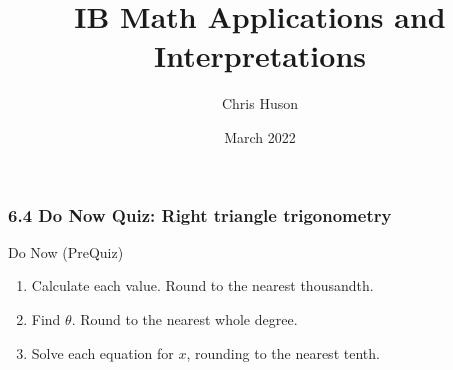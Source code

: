 \documentclass[12pt, twoside]{article}
\title{IB Math Applications and Interpretations}
\author{Chris Huson}
\date{March 2022}
\begin{document}
\subsubsection*{6.4 Do Now Quiz: Right triangle trigonometry}
Do Now (PreQuiz)
\begin{enumerate}
\item Calculate each value. Round to the nearest thousandth.
  \begin{enumerate}
  \end{enumerate}
  \vspace{1cm}

\item Find $\theta$. Round to the nearest whole degree.
  \begin{enumerate}
  \end{enumerate} \vspace{2cm}

\item Solve each equation for $x$, rounding to the nearest tenth.
  \begin{enumerate}
  \end{enumerate}
  \vspace{3cm}


\end{enumerate}
\end{document}
